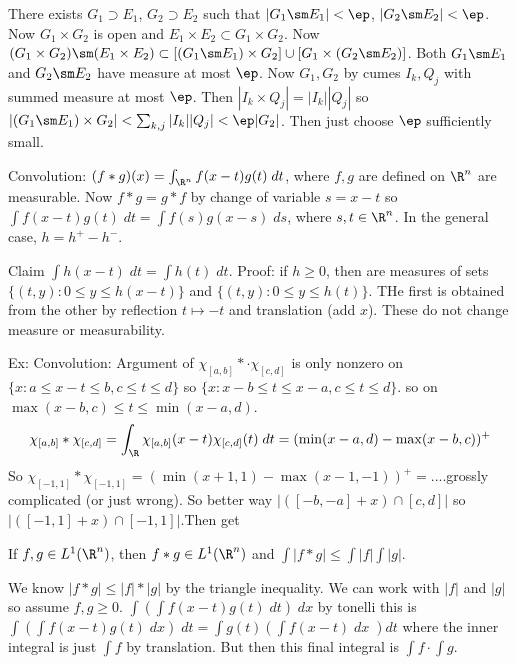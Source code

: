 There exists $G_1 \supset E_1$, $G_2 \supset E_2$ such that $|G_1 \sm E_1|<\ep$, $|G_2 \sm E_2|<\ep$. Now $G_1 \times G_2$ is open and $E_1 \times E_2 \subset G_1 \times G_2$. Now $(G_1 \times G_2) \sm (E_1 \times E_2) \subset [(G_1 \sm E_1) \times G_2] \cup [G_1 \times (G_2 \sm E_2)]$. Both $G_1 \sm E_1$ and $G_2 \sm E_2$ have measure at most $\ep$. Now $G_1, G_2$ by cumes $I_k, Q_j$ with summed measure at most $\ep$. Then $|I_k \times Q_j|= |I_k||Q_j|$ so $|(G_1 \sm E_1) \times G_2| < \sum_{k,j} |I_k| |Q_j| < \ep |G_2|$. Then just choose $\ep$ sufficiently small. 




Convolution: $(f*g)(x)= \int_{\R^n} f(x-t)g(t) \;dt$, where $f,g$ are defined on $\R^n$ are measurable.  Now $f*g=g*f$ by change of variable $s=x-t$ so $\int f(x-t)g(t) \; dt = \int f(s) g(x-s) \; ds$, where $s,t \in \R^n$. In the general case, $h= h^+ - h^-$. 

Claim $\int h(x-t) \; dt = \int h(t) \; dt$. Proof: if $h \geq 0$, then are measures of sets $\{(t,y) \colon 0 \leq y \leq h(x-t)\}$ and $\{ (t,y) \colon 0 \leq y \leq h(t) \}$. THe first is obtained from the other by reflection $t \mapsto -t$ and translation (add $x$). These do not change measure or measurability. 


\begin{ex}
Ex: Convolution: Argument of $\chi_{[a,b]} *\cdot \chi_{[c,d]}$ is only nonzero on $\{x \colon a \leq x-t \leq b, c \leq t \leq d\}$ so $\{x \colon x-b \leq t \leq x-a, c \leq t \leq d\}$. so on $\max(x-b,c) \leq t \leq \min(x-a,d)$. 
	\[
	\chi_{[a,b]} * \chi_{[c,d]}= \int_\R \chi_{[a,b]}(x-t) \chi_{[c,d]}(t) \; dt =  (\min(x-a,d) - \max(x-b,c))^+
	\]
So $\chi_{[-1,1]} * \chi_{[-1,1]}= (\min(x+1,1) - \max(x-1,-1))^+=$....grossly complicated (or just wrong). So better way $|([-b,-a] + x) \cap [c,d]|$ so $|([-1,1]+x) \cap [-1,1]|$.Then get 
\end{ex}


\begin{thm}
If $f,g \in L^1(\R^n)$, then $f*g \in L^1(\R^n)$ and $\int |f*g| \leq \int |f| \int |g|$.
\end{thm}

\pf We know $|f*g| \leq |f| * |g|$ by the triangle inequality. We can work with $|f|$ and $|g|$ so assume $f,g \geq 0$. $\int (\int f(x-t) g(t) \; dt) \; dx$ by tonelli this is $\int (\int f(x-t) g(t) \; dx ) \; dt = \int g(t) (\int f(x-t) \; dx \; )dt$ where the inner integral is just $\int f$ by translation. But then this final integral is $\int f \cdot \int g$. 

